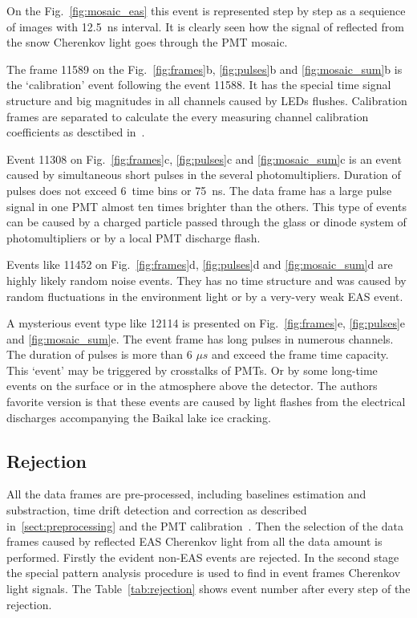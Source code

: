\documentclass[final,5p,times,twocolumn]{elsarticle}
\begin{document}
On the Fig.~\ref{fig:mosaic_eas} this event is represented step by step as a sequience of images with 12.5~ns interval. It is clearly seen how the signal of reflected from the snow Cherenkov light goes through the PMT mosaic.

The frame 11589 on the Fig.~\ref{fig:frames}b, \ref{fig:pulses}b and \ref{fig:mosaic_sum}b is the `calibration' event following the event 11588. It has the special time signal structure and big magnitudes in all channels caused by LEDs flushes. Calibration frames are separated to calculate the every measuring channel calibration coefficients as desctibed in~\cite{Ant16}.

Event 11308 on Fig.~\ref{fig:frames}c, \ref{fig:pulses}c and \ref{fig:mosaic_sum}c is an event caused by simultaneous short pulses in the several photomultipliers. Duration of pulses does not exceed 6~time bins or 75~ns. The data frame has a large pulse signal in one PMT almost ten times brighter than the others. This type of events can be caused by a charged particle passed through the glass or dinode system of photomultipliers or by a local PMT discharge flash.  

Events like 11452 on Fig.~\ref{fig:frames}d, \ref{fig:pulses}d and \ref{fig:mosaic_sum}d are highly likely random noise events. They has no time structure and was caused by random fluctuations in the environment light or by a very-very weak EAS event. 

A mysterious event type like 12114 is presented on Fig.~\ref{fig:frames}e, \ref{fig:pulses}e and \ref{fig:mosaic_sum}e. The event frame has long pulses in numerous channels. The duration of pulses is more than 6 ${\mu}s$ and exceed the frame time capacity.  This `event' may be triggered by crosstalks of PMTs. Or by some long-time events on the surface or in the atmosphere above the detector. The authors favorite version is that these events are caused by light flashes from the electrical discharges accompanying the Baikal lake ice cracking.


\subsection{Rejection}

All the data frames are pre-processed, including baselines estimation and substraction, time drift detection and correction as described in~\ref{sect:preprocessing} and the PMT calibration~\cite{Ant16}. Then the  selection of the data frames caused by reflected EAS Cherenkov light from all the data amount is performed. Firstly the evident non-EAS events are rejected. In the second stage the special pattern analysis procedure is used to find in event frames Cherenkov light signals. The Table~\ref{tab:rejection} shows event number after every step of the rejection. 
\end{document}

